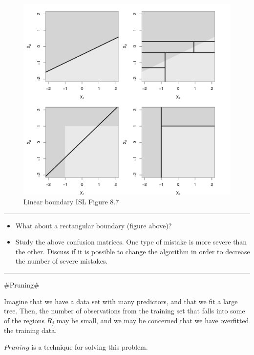 \documentclass[]{article}
\providecommand{\tightlist}{%
  \setlength{\itemsep}{0pt}\setlength{\parskip}{0pt}}
\begin{document}
\begin{figure}
\centering
\includegraphics{Introtostatlearn-326.png}
\caption{Linear boundary ISL Figure 8.7}
\end{figure}

\begin{center}\rule{0.5\linewidth}{\linethickness}\end{center}

\begin{itemize}
\tightlist
\item
  What about a rectangular boundary (figure above)?
\item
  Study the above confusion matrices. One type of mistake is more severe
  than the other. Discuss if it is possible to change the algorithm in
  order to decrease the number of severe mistakes.
\end{itemize}

\begin{center}\rule{0.5\linewidth}{\linethickness}\end{center}

\#Pruning\#

Imagine that we have a data set with many predictors, and that we fit a
large tree. Then, the number of observations from the training set that
falls into some of the regions \(R_j\) may be small, and we may be
concerned that we have overfitted the training data.

\(Pruning\) is a technique for solving this problem.
\end{document}
